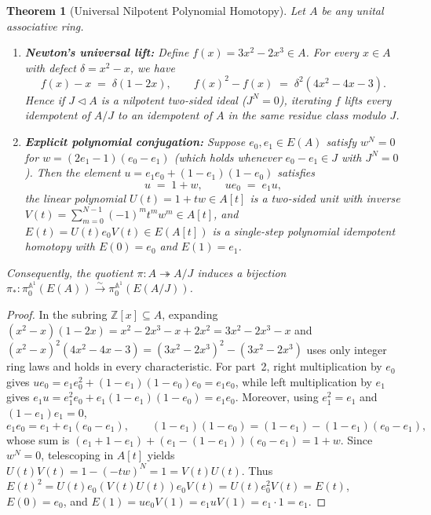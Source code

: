 \documentclass[11pt,a4paper]{article}
\newtheorem{theorem}{Theorem}[section]
\theoremstyle{definition}
\newcommand{\Z}{\mathbb{Z}}
\begin{document}
\begin{theorem}[Universal Nilpotent Polynomial Homotopy]\label{thm:nilpotent}
Let $A$ be any unital associative ring.
\begin{enumerate}
  \setlength{\itemsep}{2pt}
  \item \textbf{Newton's universal lift:} Define $f(x) = 3x^2 - 2x^3 \in A$. For every
    $x\in A$ with defect $\delta = x^2 - x$, we have
    \[
      f(x) - x \;=\; \delta(1 - 2x),
      \qquad
      f(x)^2 - f(x) \;=\; \delta^2(4x^2 - 4x - 3).
    \]
    Hence if $J\triangleleft A$ is a nilpotent two-sided ideal ($J^N=0$), iterating $f$ lifts
    every idempotent of $A/J$ to an idempotent of $A$ in the same residue class modulo $J$.
  \item \textbf{Explicit polynomial conjugation:} Suppose $e_0,e_1\in E(A)$ satisfy
    $w^N = 0$ for $w = (2e_1 - 1)(e_0 - e_1)$ (which holds whenever $e_0 - e_1\in J$ with
    $J^N=0$). Then the element $u = e_1 e_0 + (1 - e_1)(1 - e_0)$ satisfies
    \[
      u \;=\; 1 + w, \qquad u e_0 \;=\; e_1 u,
    \]
    the linear polynomial $U(t) = 1 + tw \in A[t]$ is a two-sided unit with inverse
    $V(t) = \sum_{m=0}^{N-1}(-1)^m t^m w^m \in A[t]$, and
    $E(t) = U(t) e_0 V(t) \in E(A[t])$ is a single-step polynomial idempotent homotopy with
    $E(0)=e_0$ and $E(1)=e_1$.
\end{enumerate}
Consequently, the quotient $\pi : A \twoheadrightarrow A/J$ induces a bijection
$\pi_* : \pi_0^{\mathbb{A}^1}(E(A)) \xrightarrow{\sim} \pi_0^{\mathbb{A}^1}(E(A/J))$.
\end{theorem}

\begin{proof}
In the subring $\Z[x]\subseteq A$, expanding $(x^2-x)(1-2x)=x^2-2x^3-x+2x^2=3x^2-2x^3-x$
and $(x^2-x)^2(4x^2-4x-3) = (3x^2-2x^3)^2 - (3x^2-2x^3)$ uses only integer ring laws and holds
in every characteristic. For part~2, right multiplication by $e_0$ gives
$u e_0 = e_1 e_0^2 + (1-e_1)(1-e_0)e_0 = e_1 e_0$, while left multiplication by $e_1$ gives
$e_1 u = e_1^2 e_0 + e_1(1-e_1)(1-e_0) = e_1 e_0$. Moreover, using $e_1^2 = e_1$ and
$(1-e_1)e_1 = 0$,
\[
  e_1 e_0 = e_1 + e_1(e_0 - e_1), \qquad
  (1-e_1)(1-e_0) = (1-e_1) - (1-e_1)(e_0 - e_1),
\]
whose sum is $(e_1 + 1 - e_1) + (e_1 - (1-e_1))(e_0 - e_1) = 1 + w$. Since $w^N = 0$,
telescoping in $A[t]$ yields $U(t)V(t) = 1 - (-tw)^N = 1 = V(t)U(t)$. Thus
$E(t)^2 = U(t)e_0(V(t)U(t))e_0 V(t) = U(t)e_0^2 V(t) = E(t)$, $E(0)=e_0$, and
$E(1) = u e_0 V(1) = e_1 u V(1) = e_1\cdot 1 = e_1$.
\end{proof}
\end{document}

